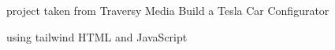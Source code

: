 
project taken from Traversy Media Build a Tesla Car Configurator

using tailwind HTML and JavaScript